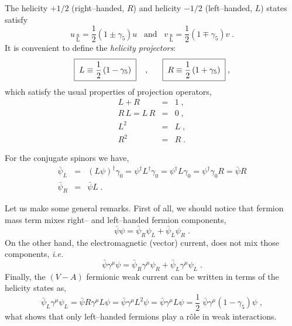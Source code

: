 \documentclass[12pt]{report}
\def\text#1{{\scriptstyle\mathrm{#1}}}
\newcommand{\gc}{\gamma_5}
\newcommand{\g}{\gamma}
\begin{document}
The helicity $+1/2$ (right--handed, $R$) and helicity $-1/2$
(left--handed, $L$) states satisfy 
\[
u \, _{\stackrel{\text{R}}{\text{L}}} = \frac{1}{2} \left(1 \pm \gc \right) u 
\;\;\;  \mbox{and} \;\;\; 
v \, _{\stackrel{\text{R}}{\text{L}}} = \frac{1}{2} \left(1 \mp \gc \right) v 
\; .
\]
It is convenient to define the {\it helicity projectors}:
\begin{equation}
\fbox{$ \; \displaystyle{L \equiv \frac{1}{2} \left(1 - \gc \right)} \;
$} 
\;\;\;\; ,   \;\;\;\;\;\; 
\fbox{$ \; \displaystyle{R \equiv \frac{1}{2} \left(1 + \gc \right)}
\; $} \; ,
\label{proj}
\end{equation}
which satisfy the usual properties of projection operators,
\begin{eqnarray*}
L + R &=& 1 \; ,\\
R \, L = L \, R & = & 0 \; ,\\
L^2 & = & L \; ,\\
R^2 & = & R \; .
\end{eqnarray*}

For the conjugate spinors we have,
\begin{eqnarray*}
\bar{\psi}_L &=& (L \psi)^\dagger \gamma_0 = \psi^\dagger L^\dagger
\gamma_0 = \psi^\dagger L \gamma_0 = \psi^\dagger \gamma_0  R =
\bar{\psi} R \\
\bar{\psi}_R &=& \bar{\psi} L \; .
\end{eqnarray*}

Let us make some general remarks. First of all, we should notice that
fermion mass term mixes right-- and left--handed fermion components,  
\begin{equation}
\bar{\psi} \psi = \bar{\psi}_R \psi_L + \bar{\psi}_L \psi_R \; .
\label{m}
\end{equation}
On the other hand, the electromagnetic (vector) current, does not mix
those components, {\it i.e.}
\begin{equation}
\bar{\psi} \g^\mu \psi = \bar{\psi}_R \g^\mu \psi_R + \bar{\psi}_L
\g^\mu \psi_L  \; .
\label{v:cur}
\end{equation}
Finally, the $(V-A)$  fermionic weak current can be written in terms of the
helicity states as,
\begin{equation}
\bar{\psi}_L \g^\mu \psi_L = \bar{\psi} R \g^\mu L \psi =  
\bar{\psi} \g^\mu L^2 \psi =   \bar{\psi} \g^\mu L \psi = 
\frac{1}{2} \; \bar{\psi} \g^\mu (1 - \gc) \psi \; ,
\label{va}
\end{equation}
what shows that only left--handed fermions play a r\^ole in weak
interactions. 
\end{document}
